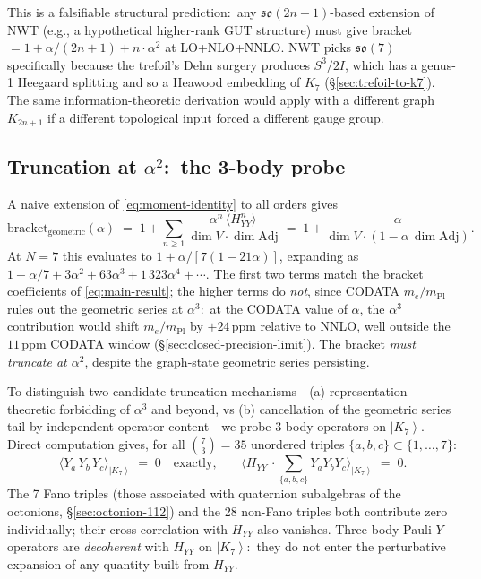 \documentclass[11pt]{article}
\newcommand{\so}{\mathfrak{so}}
\newcommand{\Adj}{\mathrm{Adj}}
\newcommand{\ket}[1]{\left|#1\right\rangle}
\newcommand{\mPl}{m_{\mathrm{Pl}}}
\begin{document}
This is a falsifiable structural prediction:\ any $\so(2n+1)$-based
extension of NWT (e.g., a hypothetical higher-rank GUT structure)
must give bracket $= 1 + \alpha/(2n+1) + n \cdot \alpha^2$ at LO+NLO+NNLO.
NWT picks $\so(7)$ specifically because the trefoil's Dehn surgery
produces $S^3/2I$, which has a genus-1 Heegaard splitting and so a
Heawood embedding of $K_7$ (\S\ref{sec:trefoil-to-k7}).  The same
information-theoretic derivation would apply with a different graph
$K_{2n+1}$ if a different topological input forced a different
gauge group.

\subsection{Truncation at $\alpha^2$:\ the 3-body probe}
\label{sec:qec-truncation}

A naive extension of \eqref{eq:moment-identity} to all orders gives
\begin{equation}
  \mathrm{bracket}_{\text{geometric}}(\alpha)
  \;=\;
  1 + \sum_{n \geq 1}\!\frac{\alpha^n\,\langle H_{YY}^n\rangle}
                            {\dim V \cdot \dim \Adj}
  \;=\;
  1 + \frac{\alpha}{\dim V \cdot (1 - \alpha\,\dim \Adj)}.
  \label{eq:bracket-geometric}
\end{equation}
At $N = 7$ this evaluates to $1 + \alpha/[7(1-21\alpha)]$, expanding as
$1 + \alpha/7 + 3\alpha^2 + 63\alpha^3 + 1\,323\alpha^4 + \cdots$.
The first two terms match the bracket coefficients of \eqref{eq:main-result};
the higher terms do \emph{not}, since CODATA $m_e/\mPl$ rules out the
geometric series at $\alpha^3$:\ at the CODATA value of $\alpha$, the
$\alpha^3$ contribution would shift $m_e/\mPl$ by $+24$\,ppm relative
to NNLO, well outside the $11$\,ppm CODATA window
(\S\ref{sec:closed-precision-limit}).  The bracket
\emph{must truncate at $\alpha^2$}, despite the graph-state
geometric series persisting.

To distinguish two candidate truncation mechanisms---(a)
representation-theoretic forbidding of $\alpha^3$ and beyond, vs
(b) cancellation of the geometric series tail by independent
operator content---we probe 3-body operators on $\ket{K_7}$.
Direct computation gives, for all $\binom{7}{3} = 35$ unordered
triples $\{a,b,c\} \subset \{1,\ldots,7\}$:
\begin{equation}
  \langle Y_a\,Y_b\,Y_c \rangle_{\ket{K_7}}
  \;=\; 0 \quad \text{exactly,}
  \qquad
  \langle H_{YY}\, \cdot \!\sum_{\{a,b,c\}}\! Y_aY_bY_c \rangle_{\ket{K_7}}
  \;=\; 0.
  \label{eq:3-body-zero}
\end{equation}
The 7 Fano triples (those associated with quaternion subalgebras
of the octonions, \S\ref{sec:octonion-112}) and the 28 non-Fano
triples both contribute zero individually; their cross-correlation
with $H_{YY}$ also vanishes.  Three-body Pauli-$Y$ operators are
\emph{decoherent} with $H_{YY}$ on $\ket{K_7}$:\ they do not enter
the perturbative expansion of any quantity built from $H_{YY}$.
\end{document}
